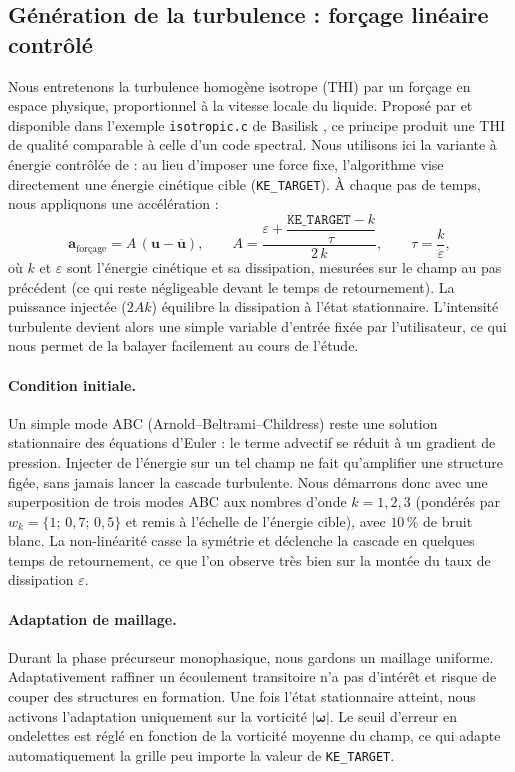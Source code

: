 \subsection{Génération de la turbulence : forçage linéaire contrôlé}
\label{subsec:forcage}

Nous entretenons la turbulence homogène isotrope (THI) par un forçage en espace physique, proportionnel à la vitesse locale du liquide. Proposé par \cite{rosales2005} et disponible dans l'exemple \texttt{isotropic.c} de Basilisk \cite{basilisk_isotropic}, ce principe produit une THI de qualité comparable à celle d'un code spectral. Nous utilisons ici la variante à énergie contrôlée de \cite{bassenne2016} : au lieu d'imposer une force fixe, l'algorithme vise directement une énergie cinétique cible (\texttt{KE\_TARGET}). À chaque pas de temps, nous appliquons une accélération :
\begin{equation}
    \mathbf{a}_{\text{forçage}} = A\,\left(\mathbf{u} - \overline{\mathbf{u}}\right),
    \qquad
    A = \frac{\varepsilon + \dfrac{\texttt{KE\_TARGET} - k}{\tau}}{2\,k},
    \qquad \tau = \frac{k}{\varepsilon},
    \label{eq:forcage}
\end{equation}
où $k$ et $\varepsilon$ sont l'énergie cinétique et sa dissipation, mesurées sur le champ au pas précédent (ce qui reste négligeable devant le temps de retournement). La puissance injectée ($2Ak$) équilibre la dissipation à l'état stationnaire. L'intensité turbulente devient alors une simple variable d'entrée fixée par l'utilisateur, ce qui nous permet de la balayer facilement au cours de l'étude.

\paragraph{Condition initiale.} Un simple mode ABC (Arnold--Beltrami--Childress) reste une solution stationnaire des équations d'Euler : le terme advectif se réduit à un gradient de pression. Injecter de l'énergie sur un tel champ ne fait qu'amplifier une structure figée, sans jamais lancer la cascade turbulente. Nous démarrons donc avec une superposition de trois modes ABC aux nombres d'onde $k=1,2,3$ (pondérés par $w_k = \{1;\,0{,}7;\,0{,}5\}$ et remis à l'échelle de l'énergie cible), avec $10\,\%$ de bruit blanc. La non-linéarité casse la symétrie et déclenche la cascade en quelques temps de retournement, ce que l'on observe très bien sur la montée du taux de dissipation $\varepsilon$.

\paragraph{Adaptation de maillage.} Durant la phase précurseur monophasique, nous gardons un maillage uniforme. Adaptativement raffiner un écoulement transitoire n'a pas d'intérêt et risque de couper des structures en formation. Une fois l'état stationnaire atteint, nous activons l'adaptation uniquement sur la vorticité $|\bm{\omega}|$. Le seuil d'erreur en ondelettes est réglé en fonction de la vorticité moyenne du champ, ce qui adapte automatiquement la grille peu importe la valeur de \texttt{KE\_TARGET}.

